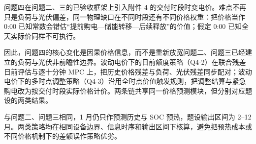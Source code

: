 问题四在问题二、三的已验收框架上引入附件 4 的交付时段时变电价。难点不再只是负荷与光伏偏差，同一物理缺口在不同时段还有不同价格权重：把价格当作 0:00 已知常数会错估“提前购电—储能转移—后续释放”的价值；假定 0:00 已知全天实际价同样不可执行。

因此，问题四的核心变化是因果价格信息，而不是重新放宽问题二、问题三已经建立的负荷与光伏非前瞻性边界。波动电价下的日前额度策略（Q4-2）在联合残差日前评估与逐十分钟 MPC 上，把历史价格残差与负荷、光伏残差同步配对；波动电价下的多时点调整策略（Q4-3）沿用全时点价值触发规则，把调整结算与紧急购电改为按交付时段实际价格计价。两条链共享同一价格预测模块，但分别对应题设的两类结果。

与问题二、问题三相同，1 月仍只作预测历史与 SOC 预热，题设输出区间为 2--12 月。两类策略均在相同设备边界、信息时序和输出区间下核算，避免把预热成本或不同价格机制下的差额误作策略优劣。
